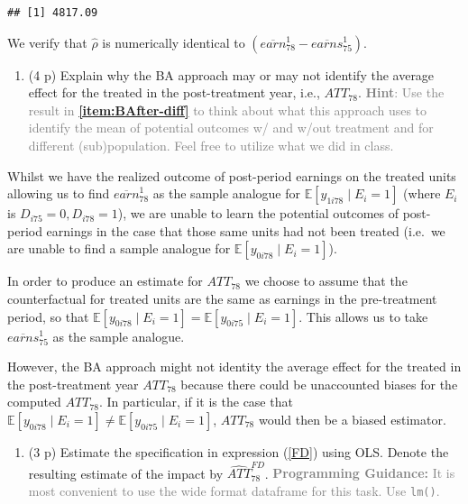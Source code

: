 \documentclass[
]{article}
\providecommand{\tightlist}{%
  \setlength{\itemsep}{0pt}\setlength{\parskip}{0pt}}
\begin{document}
\begin{verbatim}
## [1] 4817.09
\end{verbatim}

We verify that \(\hat{\rho}\) is numerically identical to
\(\left( \overline{earn}_{78}^{1}-\overline{earns}_{75}^{1}\right)\).

\begin{enumerate}
\def\labelenumi{\alph{enumi}.}
\setcounter{enumi}{4}
\tightlist
\item
  (4 p) Explain why the BA approach may or may not identify the average
  effect for the treated in the post-treatment year, i.e.,
  \({ATT}_{78}\).
  \textcolor{gray}{\textbf{Hint}: Use the result in \textbf{\ref{item:BAfter-diff}} to think about what this approach uses to identify the mean of potential outcomes w/ and w/out treatment and for different (sub)population. Feel free to utilize what we did in class.}
\end{enumerate}

Whilst we have the realized outcome of post-period earnings on the
treated units allowing us to find \(\overline{earn}_{78}^{1}\) as the
sample analogue for \(\mathbb{E}[y_{1i78} \mid E_i = 1]\) (where \(E_i\)
is \(D_{i75} = 0, D_{i78} = 1\)), we are unable to learn the potential
outcomes of post-period earnings in the case that those same units had
not been treated (i.e.~we are unable to find a sample analogue for
\(\mathbb{E}[y_{0i78} \mid E_i = 1]\)).

In order to produce an estimate for \({ATT}_{78}\) we choose to assume
that the counterfactual for treated units are the same as earnings in
the pre-treatment period, so that
\(\mathbb{E}[y_{0i78} \mid E_i = 1] = \mathbb{E}[y_{0i75} \mid E_i = 1]\).
This allows us to take \(\overline{earns}_{75}^{1}\) as the sample
analogue.

However, the BA approach might not identity the average effect for the
treated in the post-treatment year \(ATT_{78}\) because there could be
unaccounted biases for the computed \(ATT_{78}\). In particular, if it
is the case that
\(\mathbb{E}[y_{0i78} \mid E_i = 1] \neq \mathbb{E}[y_{0i75} \mid E_i = 1]\),
\(ATT_{78}\) would then be a biased estimator.

\begin{enumerate}
\def\labelenumi{\arabic{enumi}.}
\setcounter{enumi}{1}
\tightlist
\item
  (3 p) Estimate the specification in expression (\ref{FD}) using OLS.
  Denote the resulting estimate of the impact by
  \(\widehat{ATT}_{78}^{FD}\).
  \textcolor{gray}{\textbf{Programming Guidance:} It is most convenient to use the wide format dataframe for this task. Use \texttt{lm()}.}\label{item:fd}
\end{enumerate}
\end{document}
